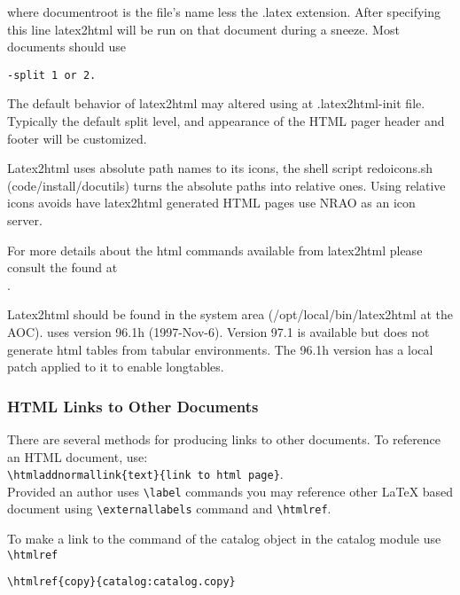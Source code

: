 where documentroot is the file's name less the .latex extension.  After
specifying this line 
latex2html will be run on that document during a sneeze.  Most \aips documents
should use
\begin{verbatim}
-split 1 or 2.
\end{verbatim}


The default behavior of latex2html may altered using at .latex2html-init
file.  Typically the default split level, and appearance of the HTML pager
header and footer will be customized.

Latex2html uses absolute path names to its icons, the shell script
redoicons.sh (code/install/docutils) turns the absolute paths into relative
ones.  Using relative icons avoids have latex2html generated HTML pages
use NRAO as an icon server.

For more details about the html commands available from latex2html please 
consult the
found at\\ 
.

Latex2html should be found in the system area (/opt/local/bin/latex2html at the
AOC).  \aips  uses version 96.1h (1997-Nov-6).  Version 97.1 is available but
does not generate html tables from tabular environments.  The 96.1h version
has a %
local patch applied to it to
enable longtables.  

\subsubsection{HTML Links to Other Documents}
There are several methods for producing links to other documents.  To
reference an HTML document, use:\\
\verb!\htmladdnormallink{text}{link to html page}!.\\
Provided an author uses
\verb!\label! commands you may reference other 
LaTeX based document using 
\verb!\externallabels! command and \verb!\htmlref!.

To make a link to the  command of the
catalog object in the catalog module use \verb!\htmlref!
\begin{verbatim}
\htmlref{copy}{catalog:catalog.copy}
\end{verbatim}

